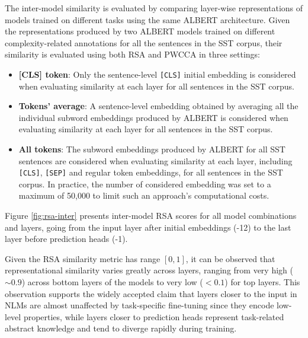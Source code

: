 \documentclass[a4paper, nobind]{templates/ociamthesis}
\begin{document}
The inter-model similarity is evaluated by comparing layer-wise representations of models trained on different tasks using the same ALBERT architecture. Given the representations produced by two ALBERT models trained on different complexity-related annotations for all the sentences in the SST corpus, their similarity is evaluated using both RSA and PWCCA in three settings:

\begin{itemize}
\item
  \textbf{{[}CLS{]} token}: Only the sentence-level \texttt{{[}CLS{]}} initial embedding is considered when evaluating similarity at each layer for all sentences in the SST corpus.
\item
  \textbf{Tokens' average}: A sentence-level embedding obtained by averaging all the individual subword embeddings produced by ALBERT is considered when evaluating similarity at each layer for all sentences in the SST corpus.
\item
  \textbf{All tokens}: The subword embeddings produced by ALBERT for all SST sentences are considered when evaluating similarity at each layer, including \texttt{{[}CLS{]}}, \texttt{{[}SEP{]}} and regular token embeddings, for all sentences in the SST corpus. In practice, the number of considered embedding was set to a maximum of 50,000 to limit such an approach's computational costs.
\end{itemize}

\noindent
Figure \ref{fig:rsa-inter} presents inter-model RSA scores for all model combinations and layers, going from the input layer after initial embeddings (-12) to the last layer before prediction heads (-1).

Given the RSA similarity metric has range \([0,1]\), it can be observed that representational similarity varies greatly across layers, ranging from very high (\(\sim 0.9\)) across bottom layers of the models to very low (\(< 0.1\)) for top layers. This observation supports the widely accepted claim that layers closer to the input in NLMs are almost unaffected by task-specific fine-tuning since they encode low-level properties, while layers closer to prediction heads represent task-related abstract knowledge and tend to diverge rapidly during training.
\end{document}
